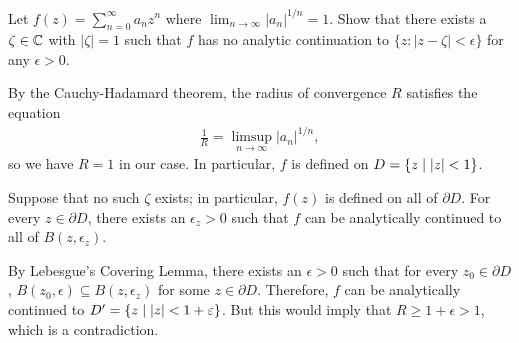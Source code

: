 \begin{problem}
Let $f(z) = \sum_{n=0}^\infty a_n z^n$ where $\lim_{n \to \infty} |a_n|^{1/n} = 1$. Show that there exists a $\zeta \in \mathbb{C}$ with $|\zeta| = 1$ such that $f$ has no analytic continuation to $\{z : |z - \zeta| < \epsilon\}$ for any $\epsilon > 0$.
\begin{solution}
By the Cauchy-Hadamard theorem, the radius of convergence $R$ satisfies the equation
\begin{align*}
    \frac{1}{R} = \limsup_{n \to \infty} |a_n|^{1/n},
\end{align*}
so we have $R = 1$ in our case. In particular, $f$ is defined on $D = \left\{ z \mid |z| < 1\right\}$.

Suppose that no such $\zeta$ exists; in particular, $f(z)$ is defined on all of $\partial D$. For every $z \in \partial D$, there exists an $\epsilon_z > 0$ such that $f$ can be analytically continued to all of $B(z, \epsilon_z)$.

By Lebesgue's Covering Lemma, there exists an $\epsilon > 0$ such that for every $z_0 \in \partial D$, $B(z_0, \epsilon) \subseteq B(z, \epsilon_z)$ for some $z \in \partial D$. Therefore, $f$ can be analytically continued to $D' = \left\{ z \mid |z| < 1 + \varepsilon\right\}$. But this would imply that $R \geq 1 + \epsilon > 1$, which is a contradiction.
\end{solution}
\end{problem}

